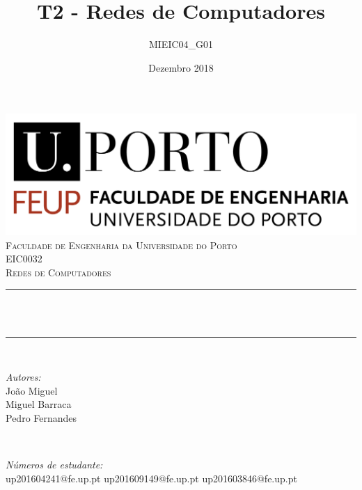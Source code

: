 \documentclass{article}
\title{T2 - Redes de Computadores}
\author{MIEIC04\_G01}
\date{Dezembro 2018}
\begin{document}
\begin{titlepage}
	\centering
    \vspace*{0.5 cm}
    \includegraphics[scale = 0.5]{feup_logo.png}\\[1.0 cm]	%
    \textsc{\LARGE Faculdade de Engenharia da Universidade do Porto}\\[2.0 cm]	%
	\textsc{\Large EIC0032}\\[0.5 cm]				%
	\textsc{\large Redes de Computadores}\\[0.5 cm]				%
	\rule{\linewidth}{0.2 mm} \\[0.4 cm]
	{ \huge \bfseries \thetitle}\\ 
	\rule{\linewidth}{0.2 mm} \\[1.5 cm]
	
	\begin{minipage}{0.4\textwidth}
		\begin{flushleft} \large
			\emph{Autores:}\\
            João Miguel\\
            Miguel Barraca\\
            Pedro Fernandes
        \end{flushleft}
    \end{minipage}~
    \begin{minipage}{0.4\textwidth}
        \begin{flushright} \large
            \emph{Números de estudante:} \\
            up201604241@fe.up.pt
            up201609149@fe.up.pt
            up201603846@fe.up.pt
		\end{flushright}
\end{minipage}\\[2 cm]
	
{\large \thedate}\\[2 cm]
 
\vfill
	
\end{titlepage}
\end{document}
